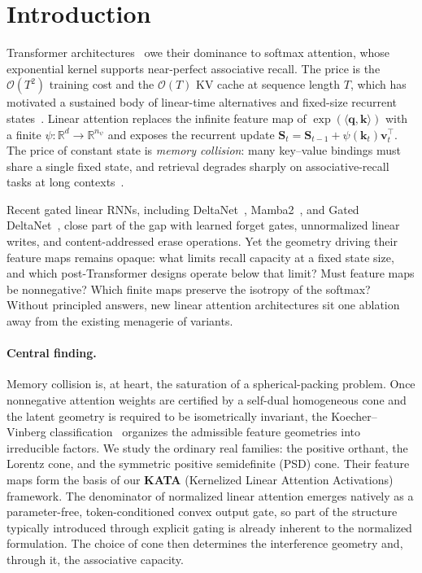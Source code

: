 \documentclass{article}
\newcommand{\1}{\bm{1}}
\newcommand{\lrangle}[1]{\langle#1\rangle}
\def\vk{{\bm{k}}}
\def\vq{{\bm{q}}}
\def\vv{{\bm{v}}}
\def\mS{{\bm{S}}}
\def\gO{{\mathcal{O}}}
\newcommand{\R}{\mathbb{R}}
\newcommand{\seql}{T}
\theoremstyle{definition}
\begin{document}
\section{Introduction} \label{sec:intro}
Transformer architectures~\citep{vaswani17attention} owe their dominance to softmax attention, whose exponential kernel
supports near-perfect associative recall. The price is the $\gO(\seql^2)$ training cost and the
$\gO(\seql)$ KV cache at sequence length $\seql$, which has motivated a sustained body of
linear-time alternatives and fixed-size recurrent
states~\citep{katharopoulos20transformers,choromanski21performers,peng21rfa,sun23retentive,gu24mamba,dao24mamba2}.
Linear attention replaces the infinite feature map of $\exp(\lrangle{\vq,\vk})$ with a finite
$\psi:\R^d\to\R^{n_\psi}$ and exposes the recurrent update $\mS_t=\mS_{t-1}+\psi(\vk_t)\vv_t^\top$. The
price of constant state is \emph{memory collision}: many key--value bindings must share a single
fixed state, and retrieval degrades sharply on associative-recall tasks at long
contexts~\citep{schlag21linear,jelassi24repeat,du25mom}.

Recent gated linear RNNs, including DeltaNet~\citep{yang24deltanet},
Mamba2~\citep{dao24mamba2}, and Gated DeltaNet~\citep{yang25gateddeltanet}, close part of the gap
with learned forget gates, unnormalized linear writes, and content-addressed erase operations. Yet
the geometry driving their feature maps remains opaque: what limits recall capacity at a fixed
state size, and which post-Transformer designs operate below that limit? Must feature maps be
nonnegative? Which finite maps preserve the isotropy of the softmax? Without principled answers,
new linear attention architectures sit one ablation away from the existing menagerie of variants.

\paragraph{Central finding.} Memory collision is, at heart, the saturation of a spherical-packing
problem. Once nonnegative attention weights are certified by a self-dual homogeneous cone and the
latent geometry is required to be isometrically invariant, the Koecher--Vinberg
classification~\citep{koecher57positivitatsbereiche,vinberg63homogeneous,faraut94analysis}
organizes the admissible feature geometries into irreducible factors. We study the ordinary real
families: the positive orthant, the Lorentz cone, and the symmetric positive semidefinite (PSD) cone.
Their feature maps form the basis of our \textbf{KATA} (Kernelized Linear Attention Activations)
framework. The denominator of normalized linear attention emerges natively as a parameter-free,
token-conditioned convex output gate, so part of the structure typically introduced through explicit
gating is already inherent to the normalized formulation. The choice of cone then determines the
interference geometry and, through it, the associative capacity.
\end{document}
